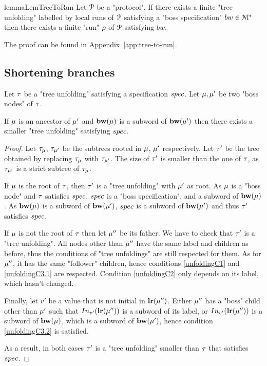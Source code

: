 \begin{restatable}{lemma}{LemTreeToRun}
	\label{lem:tree-to-run}
	Let $\mathcal{P}$ be a "protocol".
	If there exists a finite "tree unfolding" labelled by local runs of $\mathcal{P}$ satisfying a "boss specification" $bw \in \mathcal{M}^*$ then there exists  a finite "run" $\rho$ of $\mathcal{P}$ satisfying $bw$.
\end{restatable}

The proof can be found in Appendix~\ref{app:tree-to-run}.



\subsection{Shortening branches}

\begin{lemma}
	\label{lem:increasing-bosses}
	Let $\tau$ be a "tree unfolding" satisfying a specification $\spec$.
	Let $\mu, \mu'$ be two "boss nodes" of $\tau$.
	
	If $\mu$ is an ancestor of $\mu'$ and $\mathbf{bw}(\mu)$ is a subword of $\mathbf{bw}(\mu')$ then there exists a smaller "tree unfolding" satisfying $\spec$.  
\end{lemma}

\ifproofs
\begin{proof}
	Let $\tau_{\mu}$, $\tau_{\mu'}$ be the subtrees rooted in $\mu$, $\mu'$ respectively. 
	Let $\tau'$ be the tree obtained by replacing $\tau_{\mu}$ with $\tau_{\mu'}$. The size of $\tau'$ is smaller than the one of $\tau$, as $\tau_{\mu'}$ is a strict subtree of $\tau_{\mu}$.
	
	If $\mu$ is the root of $\tau$, then $\tau'$ is a "tree unfolding" with $\mu'$ as root. As $\mu$ is a "boss node" and $\tau$ satisfies $\spec$, $\spec$ is a "boss specification", and a subword of $\mathbf{bw}(\mu)$.
	As $\mathbf{bw}(\mu)$ is a subword of $\mathbf{bw}(\mu')$, $\spec$ is a subword of $\mathbf{bw}(\mu')$ and thus $\tau'$ satisfies $\spec$.
	
	If $\mu$ is not the root of $\tau$ then let $\mu''$ be its father. We have to check that $\tau'$ is a "tree unfolding". 
	All nodes other than $\mu''$ have the same label and children as before, thus the conditions of "tree unfoldings" are still respected for them.
	As for $\mu''$, it has the same "follower" children, hence conditions \ref{unfoldingC1} and \ref{unfoldingC3.1} are respected. Condition \ref{unfoldingC2} only depends on its label, which hasn't changed.
	
	Finally, let $v'$ be a value that is not initial in $\mathbf{lr}(\mu'')$. Either $\mu''$ has a "boss" child other than $\mu'$ such that $\vinput{v'}{\localrunlabel{\node''}}$ is a subword of its label, or $\vinput{v'}{\localrunlabel{\node''}}$ is a subword of $\mathbf{bw}(\mu)$, which is a subword of $\mathbf{bw}(\mu')$, hence condition \ref{unfoldingC3.2} is satisfied. 
	
	As a result, in both cases $\tau'$ is a "tree unfolding" smaller than $\tau$ that satisfies $\spec$. 
\end{proof}
\fi

